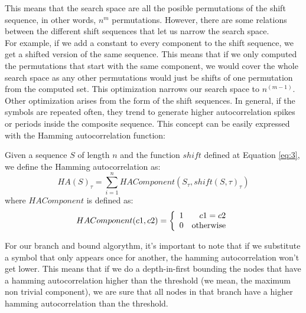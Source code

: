   This means that the search space are all the posible permutations of the
  shift sequence, in other words, $n^m$ permutations. However, there are some
  relations between the different shift sequences that let us narrow the
  search space.\\

  For example, if we add a constant to every component to the shift sequence,
  we get a shifted version of the same sequence. This means that if we only
  computed the permutations that start with the same component, we would cover
  the whole search space as any other permutations would just be shifts of
  one permutation from the computed set. This optimization narrows our
  search space to $n^{(m-1)}$.\\

  Other optimization arises from the form of the shift sequences. In general,
  if the symbols are repeated often, they trend to generate higher
  autocorrelation spikes or periods inside the composite sequence. This
  concept can be easily expressed with the Hamming autocorrelation function:\\

  \begin{definition}
    Given a sequence $S$ of length $n$ and the function $shift$ defined at
    Equation \ref{eq:3}, we define the Hamming autocorrelation as:
      \begin{equation}
        HA(S)_{\tau} = \sum_{i=1}^{n} HAComponent(S_{\tau}, shift(S, \tau)_{\tau})
      \end{equation}
    where $HAComponent$ is defined as:
      \begin{equation}
        HAComponent(c1, c2) = \left\{\begin{array}{lr}
            1  &  c1 = c2\\
            0  & \textnormal{otherwise} \\
        \end{array}\right.
      \end{equation}
  \end{definition}

  For our branch and bound algorythm, it's important to note that if we
  substitute a symbol that only appears once for another, the hamming
  autocorrelation won't get lower. This means that if we do a depth-in-first
  bounding the nodes that have a hamming autocorrelation higher than the
  threshold (we mean, the maximum non trivial component), we are sure that all
  nodes in that branch have a higher hamming autocorrelation than the
  threshold.\\

